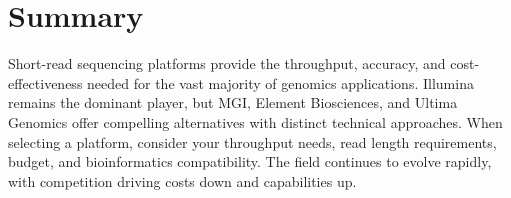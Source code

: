 \section{Summary}

Short-read sequencing platforms provide the throughput, accuracy, and cost-effectiveness needed for the vast majority of genomics applications. Illumina remains the dominant player, but MGI, Element Biosciences, and Ultima Genomics offer compelling alternatives with distinct technical approaches. When selecting a platform, consider your throughput needs, read length requirements, budget, and bioinformatics compatibility. The field continues to evolve rapidly, with competition driving costs down and capabilities up.
